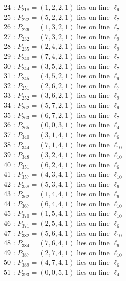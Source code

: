 \documentclass{article}
\begin{document}
{\begin{multicols}{2}
24 : $P_{218}=( 1, 2, 2, 1 )$ lies on line $\ell_{9}$\\
25 : $P_{222}=( 5, 2, 2, 1 )$ lies on line $\ell_{7}$\\
26 : $P_{226}=( 1, 3, 2, 1 )$ lies on line $\ell_{7}$\\
27 : $P_{232}=( 7, 3, 2, 1 )$ lies on line $\ell_{9}$\\
28 : $P_{235}=( 2, 4, 2, 1 )$ lies on line $\ell_{9}$\\
29 : $P_{240}=( 7, 4, 2, 1 )$ lies on line $\ell_{7}$\\
30 : $P_{244}=( 3, 5, 2, 1 )$ lies on line $\ell_{7}$\\
31 : $P_{245}=( 4, 5, 2, 1 )$ lies on line $\ell_{9}$\\
32 : $P_{251}=( 2, 6, 2, 1 )$ lies on line $\ell_{7}$\\
33 : $P_{252}=( 3, 6, 2, 1 )$ lies on line $\ell_{9}$\\
34 : $P_{262}=( 5, 7, 2, 1 )$ lies on line $\ell_{9}$\\
35 : $P_{263}=( 6, 7, 2, 1 )$ lies on line $\ell_{7}$\\
36 : $P_{265}=( 0, 0, 3, 1 )$ lies on line $\ell_{4}$\\
37 : $P_{340}=( 3, 1, 4, 1 )$ lies on line $\ell_{6}$\\
38 : $P_{344}=( 7, 1, 4, 1 )$ lies on line $\ell_{10}$\\
39 : $P_{348}=( 3, 2, 4, 1 )$ lies on line $\ell_{10}$\\
40 : $P_{351}=( 6, 2, 4, 1 )$ lies on line $\ell_{6}$\\
41 : $P_{357}=( 4, 3, 4, 1 )$ lies on line $\ell_{10}$\\
42 : $P_{358}=( 5, 3, 4, 1 )$ lies on line $\ell_{6}$\\
43 : $P_{362}=( 1, 4, 4, 1 )$ lies on line $\ell_{6}$\\
44 : $P_{367}=( 6, 4, 4, 1 )$ lies on line $\ell_{10}$\\
45 : $P_{370}=( 1, 5, 4, 1 )$ lies on line $\ell_{10}$\\
46 : $P_{371}=( 2, 5, 4, 1 )$ lies on line $\ell_{6}$\\
47 : $P_{382}=( 5, 6, 4, 1 )$ lies on line $\ell_{10}$\\
48 : $P_{384}=( 7, 6, 4, 1 )$ lies on line $\ell_{6}$\\
49 : $P_{387}=( 2, 7, 4, 1 )$ lies on line $\ell_{10}$\\
50 : $P_{389}=( 4, 7, 4, 1 )$ lies on line $\ell_{6}$\\
51 : $P_{393}=( 0, 0, 5, 1 )$ lies on line $\ell_{4}$\\

\end{multicols}}
\end{document}
